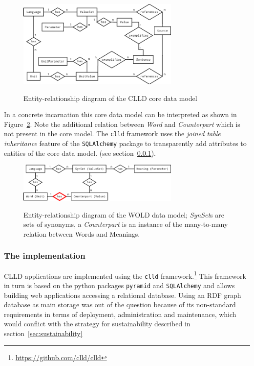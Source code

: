 \documentclass[a4paper,10pt]{article}
\begin{document}
\begin{figure}[h!]
  \caption{Entity-relationship diagram of the CLLD core data model}
  \centering
\includegraphics[width=8cm]{clld_erd.png}
\label{cllddatamodel}
\end{figure}

In a concrete incarnation this core data model can be interpreted as shown in Figure~\ref{wolddatamodel}.
Note the additional relation between \emph{Word} and \emph{Counterpart} which is not present in the core model.
The \texttt{clld} framework uses the \emph{joined table inheritance} feature of the \texttt{SQLAlchemy} package
to transparently add attributes to entities of the core data model. 
(see section~\ref{sec:implementation}).


\begin{figure}[h!]
  \caption{Entity-relationship diagram of the WOLD data model; \textit{SynSet}s are sets of synonyms,
  a \textit{Counterpart} is an instance of the many-to-many relation between Words and Meanings.}
  \centering
\includegraphics[width=8cm]{wold_erd.png}
\label{wolddatamodel}
\end{figure}


\subsubsection{The implementation}
\label{sec:implementation}
CLLD applications are implemented using the \texttt{clld} framework.\footnote{\url{https://github.com/clld/clld}}
This framework in turn is based on the python packages \texttt{pyramid} and \texttt{SQLAlchemy}
and allows building web applications accessing a relational database.
Using an RDF graph database as main storage was out of the question because of its non-standard requirements
in terms of deployment, administration and maintenance, which would conflict with the strategy
for sustainability described in section~\ref{sec:sustainability}
\end{document}
